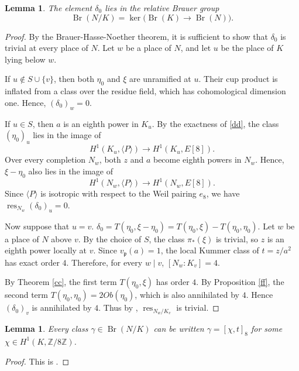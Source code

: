 \documentclass[11pt,a4paper]{amsart}
\newtheorem{lemma}[theorem]{Lemma}
\theoremstyle{definition}
\newcommand{\Br}{\operatorname{Br}}
\numberwithin{equation}{section}
\begin{document}
\begin{lemma}\label{lem:defect-relative}
The element $\delta_0$ lies in the relative Brauer group
\[
 \Br(N/K)=\ker\bigl(\Br(K)\to\Br(N)\bigr).
\]
\end{lemma}

\begin{proof}
By the Brauer-Hasse-Noether theorem, it is sufficient to show that
$\delta_0$ is trivial at every place of $N$. Let $w$ be a place of $N$,
and let $u$ be the place of $K$ lying below $w$.

If $u\notin S\cup\{v\}$, then both $\eta_0$ and $\xi$ are
unramified at $u$. Their cup product is inflated from a class over the residue
field, which has cohomological dimension one. Hence, $
(\delta_0)_w=0$.

If $u\in S$, then $a$ is an eighth power in $K_u$. By the exactness of
\eqref{dd}, the class $(\eta_0)_u$ lies in the image of
\[
H^1(K_u,\langle P\rangle)\longrightarrow H^1(K_u,E[8]).
\]
Over every completion $N_w$, both $z$ and $a$ become eighth powers in
$N_w$. Hence, $\xi-\eta_0$ also lies in the image of
\[
H^1(N_w,\langle P\rangle)\longrightarrow H^1(N_w,E[8]).
\]
Since $\langle P\rangle$ is isotropic with respect to the Weil pairing
$e_8$, we have
$
\operatorname{res}_{N_w}(\delta_0)_u=0.
$

Now suppose that $u=v$. $\delta_0=T(\eta_0,\xi-\eta_0)=T(\eta_0,\xi)-T(\eta_0,\eta_0)$. Let $w$ be a place of $N$ above
$v$. By the choice of $S$, the class $\pi_*(\xi)$ is trivial,
so $z$ is an eighth power locally at $v$. Since $v_{\mathfrak p}(a)=1$,
the local Kummer class of $t=z/a^2$
has exact order \(4\). Therefore, for every \(w\mid v\), $[N_w:K_{v}]=4.
$

By Theorem \ref{cc}, the first term \(T(\eta_0,\xi)\) has order \(4\). By Proposition \ref{ff}, the
second term $T(\eta_0,\eta_0)=2Ob(\eta_0)$, which is also annihilated by \(4\). Hence
\((\delta_0)_v\) is annihilated by \(4\). Thus by \cite[Chapter XIII, Proposition 6]{Serre}, $\operatorname{res}_{N_w/K_{v}}$ is trivial.
\end{proof}


\begin{lemma}
\label{lem:relative-symbol}
Every class $\gamma\in\Br(N/K)$ can be written $ \gamma=[\chi,t]_8 $ for some $\chi\in H^1(K,\mathbb{Z}/8\mathbb{Z})$.
\end{lemma}
\begin{proof}
This is \cite[Section 4.7, Corollary 4.7.6]{GilleSzamuely}.
\end{proof}
\end{document}
